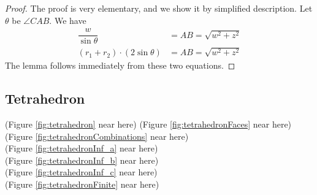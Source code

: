 \documentclass[suppldata, dvipdfmx]{interact}
\theoremstyle{plain}%
\newtheorem{lemma}[theorem]{Lemma}
\theoremstyle{definition}
\theoremstyle{remark}
\theoremstyle{problemstyle}
\begin{document}
\begin{proof}
The proof is very elementary, and we show it by simplified description.  Let $\theta$ be $\angle CAB$.  We have
\begin{align*}
\dfrac{w}{\sin\theta} &= AB = \sqrt{w^2+z^2}\\
(r_1+r_2)\cdot(2\sin\theta ) &= AB = \sqrt{w^2+z^2}
\end{align*}
The lemma follows immediately from these two equations.
\end{proof}

%


\subsection{Tetrahedron}
\noindent(Figure \ref{fig:tetrahedron} near here)
(Figure \ref{fig:tetrahedronFaces} near here)\\
(Figure \ref{fig:tetrahedronCombinations}
 near here)\\
(Figure \ref{fig:tetrahedronInf_a}
 near here)\\
(Figure \ref{fig:tetrahedronInf_b}
 near here)\\
(Figure \ref{fig:tetrahedronInf_c}
 near here)\\
(Figure \ref{fig:tetrahedronFinite}
 near here)
\end{document}
